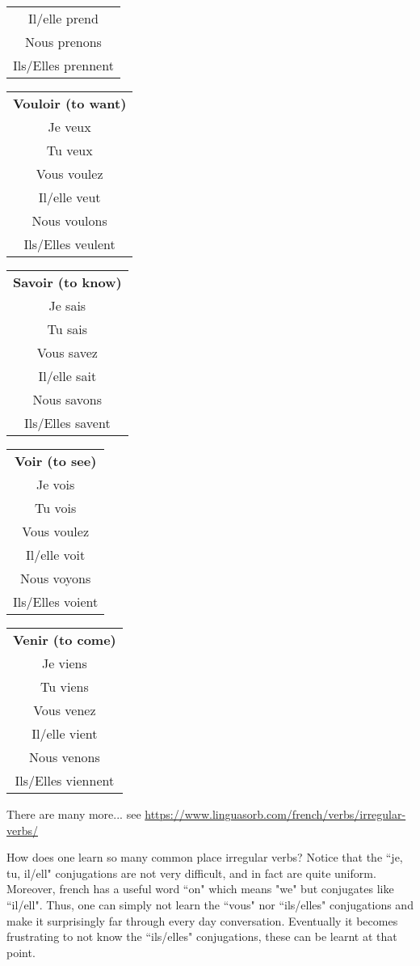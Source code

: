 \documentclass[12pt]{article}
\theoremstyle{plain}
\theoremstyle{definition}
\begin{document}
\begin{center}
\begin{tabular}{|c|}
	Il/elle prend\\
	Nous prenons\\
	Ils/Elles prennent\\
	\hline
\end{tabular}
%
\begin{tabular}{|c|}
	\hline
	\textbf{Vouloir (to want)}\\
	Je veux\\
	Tu veux\\
	Vous voulez\\
	Il/elle veut\\
	Nous voulons\\
	Ils/Elles veulent\\
	\hline
\end{tabular}
	\begin{tabular}{|c|}
	\hline
	\textbf{Savoir (to know)}\\
	Je sais\\
	Tu sais\\
	Vous savez\\
	Il/elle sait\\
	Nous savons\\
	Ils/Elles savent\\
	\hline
\end{tabular}
%
\begin{tabular}{|c|}
	\hline
	\textbf{Voir (to see)}\\
	Je vois\\
	Tu vois\\
	Vous voulez\\
	Il/elle voit\\
	Nous voyons\\
	Ils/Elles voient\\
	\hline
\end{tabular}
%
\begin{tabular}{|c|}
	\hline
	\textbf{Venir (to come)}\\
	Je viens\\
	Tu viens\\
	Vous venez\\
	Il/elle vient\\
	Nous venons\\
	Ils/Elles viennent\\
	\hline
\end{tabular}
	\end{center}
	There are many more... see \url{https://www.linguasorb.com/french/verbs/irregular-verbs/}
	
	How does one learn so many common place irregular verbs? Notice that the ``je, tu, il/ell" conjugations are not very difficult, and in fact are quite uniform. Moreover, french has a useful word ``on" which means "we" but conjugates like ``il/ell". Thus, one can simply not learn the ``vous" nor ``ils/elles" conjugations and make it surprisingly far through every day conversation. Eventually it becomes frustrating to not know the ``ils/elles" conjugations, these can be learnt at that point.
	
\end{document}
